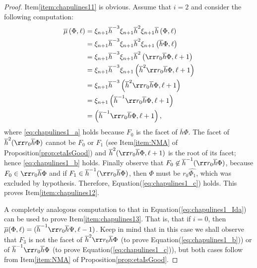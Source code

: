 \documentclass[final]{amsart}
\theoremstyle{plain}
\theoremstyle{definition}
\theoremstyle{remark}
\numberwithin{equation}{section}
\renewcommand{\{}{\lbrace}
\renewcommand{\}}{\rbrace}
\renewcommand{\bar}{\overline}
\renewcommand{\hat}{\widehat}
\newcommand{\kng}{{h}}
\newcommand{\etab}{\bar{\kng}}
\newcommand{\mub}{\bar{\mu}}
\newcommand{\te}{\xi}
\begin{document}
\begin{proof}
  Item\nobreakspace \ref {item:chapulines11} is obvious.
  Assume that $i = 2 $
  and consider the following computation:
  \begin{subequations}\label{eq:chapulines1_Ida}
  \begin{align}
    \mub \left(\Phi, \ell \right)
     &= \te_{n+1} \etab^{-3} \te_{n+1} \etab^{2} \te_{n+1} \etab \left( \Phi, \ell \right) \nonumber \\
     &= \te_{n+1} \etab^{-3} \te_{n+1} \etab^{2} \te_{n+1}  \left(\etab \Phi, \ell \right) \nonumber \\
     &= \te_{n+1} \etab^{-3} \te_{n+1} \etab^{2} \left(\rr r_{0}\etab \Phi, \ell+1  \right)  \label{eq:chapulines1_a}\\
     &= \te_{n+1} \etab^{-3} \te_{n+1}  \left( \etab^{2} \rr r_{0}\etab \Phi, \ell+1  \right) \nonumber \\
&= \te_{n+1} \etab^{-3}\left( \etab^{2} \rr r_{0}\etab \Phi, \ell+1  \right) \label{eq:chapulines1_b}\\
     &= \te_{n+1} \left(\etab^{-1} \rr r_{0}\etab \Phi, \ell+1  \right) \nonumber\\
&= \left(\etab^{-1} \rr r_{0}\etab \Phi, \ell+1  \right), \label{eq:chapulines1_c}
  \end{align}
  \end{subequations}
  where \eqref{eq:chapulines1_a} holds because $F_{0}$ is the facet of $\etab \Phi$.
  The facet of $\etab^{2} (\rr r_{0} \etab \Phi)$ cannot be $F_{0}$ or $F_{1}$ (see Item\nobreakspace \ref {item:NMA} of Proposition\nobreakspace \ref {prop:etaIsGood}) and $\etab^{2} (\rr r_{0} \etab \Phi,\ell+1)$ is the root of its facet; hence \eqref{eq:chapulines1_b} holds.
  Finally observe that $F_{0} \not \in \etab^{-1}(\rr r_{0}\etab \Phi)$, because $F_{0} \in \rr r_{0}\etab \Phi$ and if $F_{1} \in \etab^{-1}(\rr r_{0}\etab \Phi)$, then $\Phi$ must be
  $r_{0}\hat{\Phi_{1}}$, which was excluded by hypothesis.
  Therefore, Equation\nobreakspace \textup {(\ref {eq:chapulines1_c})} holds.
  This proves Item\nobreakspace \ref {item:chapulines12}.

  A completely analogous computation to that in Equation\nobreakspace \textup {(\ref {eq:chapulines1_Ida})} can be used to prove Item\nobreakspace \ref {item:chapulines13}. That is, that if $i=0$, then $\mub(\Phi, \ell) = (\etab^{-1} \rr r_{0} \etab \Psi, \ell-1)$.
  Keep in mind that in this case we shall observe that $F_3$ is not the facet of $ \etab^{2} \rr r_0 \etab \Phi $ (to prove Equation\nobreakspace \textup {(\ref {eq:chapulines1_b})}) or of $ \etab^{-1} \rr r_0 \etab \Phi $ (to prove Equation\nobreakspace \textup {(\ref {eq:chapulines1_c})}), but both cases follow from Item\nobreakspace \ref {item:NMA} of Proposition\nobreakspace \ref {prop:etaIsGood}.


\end{proof}
\end{document}
